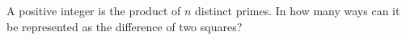 A positive integer is the product of $n$ distinct primes. In how many ways can it be represented as the difference of two squares?
